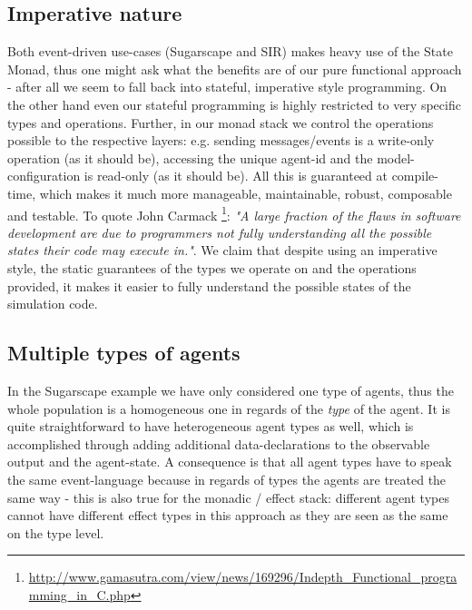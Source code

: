 \subsection{Imperative nature}
Both event-driven use-cases (Sugarscape and SIR) makes heavy use of the State Monad, thus one might ask what the benefits are of our pure functional approach - after all we seem to fall back into stateful, imperative style programming. %
On the other hand even our stateful programming is highly restricted to very specific types and operations. Further, in our monad stack we control the operations possible to the respective layers: e.g. sending messages/events is a write-only operation (as it should be), accessing the unique agent-id and the model-configuration is read-only (as it should be). All this is guaranteed at compile-time, which makes it much more manageable, maintainable, robust, composable and testable.
To quote John Carmack \footnote{\url{http://www.gamasutra.com/view/news/169296/Indepth_Functional_programming_in_C.php}}: \emph{"A large fraction of the flaws in software development are due to programmers not fully understanding all the possible states their code may execute in."}. We claim that despite using an imperative style, the static guarantees of the types we operate on and the operations provided, it makes it easier to fully understand the possible states of the simulation code.


\subsection{Multiple types of agents}
In the Sugarscape example we have only considered one type of agents, thus the whole population is a homogeneous one in regards of the \textit{type} of the agent. It is quite straightforward to have heterogeneous agent types as well, which is accomplished through adding additional data-declarations to the observable output and the agent-state. A consequence is that all agent types have to speak the same event-language because in regards of types the agents are treated the same way - this is also true for the monadic / effect stack: different agent types cannot have different effect types in this approach as they are seen as the same on the type level.

